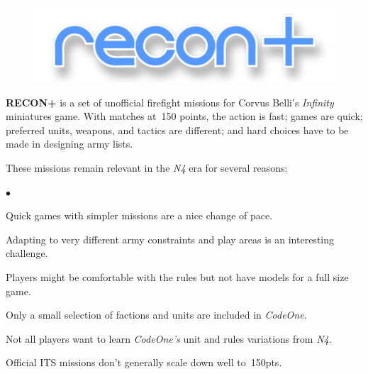 \documentclass[14pt,dvipsnames]{extarticle}
\newenvironment{squishitemize}
{\begin{list}{$\bullet$}{%
    \setlength{\itemsep}{2pt}%
    \setlength{\parsep}{2pt}%
    \setlength{\topsep}{2pt}%
    \setlength{\parskip}{0pt} %
    \renewcommand{\labelitemi}{--}}}
  {\end{list}}
\newcommand{\reconplus}{\textbf{RECON+}\xspace}
\newcommand\BackgroundPic[1]{%
\put(0,0){%
\parbox[b][\paperheight]{\paperwidth}{%
\vfill%
\centering%
\texttt{[image: \#1]}%
\vfill%
}}}
\newcommand{\setbackground}{%
\AddToShipoutPicture{\BackgroundPic{art/background/background.pdf}}%
}
\begin{document}
\thispagestyle{empty}


\clearpage


\begin{figure}[t!]
  \centering
  \includegraphics{art/cover/title.pdf}
\end{figure}

\reconplus is a set of unofficial firefight missions for Corvus
Belli's \emph{Infinity} miniatures game.  With matches at~150 points,
the action is fast; games are quick; preferred units, weapons, and
tactics are different; and hard choices have to be made in designing
army lists.


These missions remain relevant in the \emph{N4} era for several
reasons:
\begin{squishitemize}
\item Quick games with simpler missions are a nice change of pace.

\item Adapting to very different army constraints and play areas is an
  interesting challenge.

\item Players might be comfortable with the rules but not have models
  for a full size game.

\item Only a small selection of factions and units are included in
  \emph{CodeOne}.

\item Not all players want to learn \emph{CodeOne's} unit and rules
  variations from \emph{N4}.

\item Official ITS missions don't generally scale down well to~150pts.
\end{squishitemize}
\end{document}
